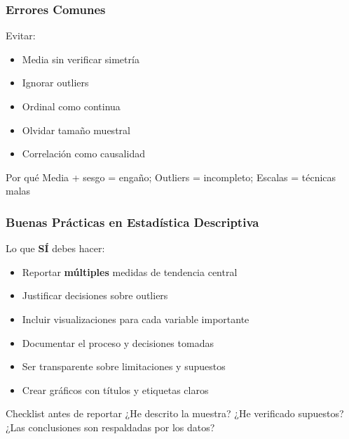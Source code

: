 \documentclass[aspectratio=169,11pt]{beamer}
\begin{document}
\begin{frame}[fragile]
\frametitle{Errores Comunes}
\small

\begin{alertblock}{Evitar:}
  \begin{itemize}
    \item Media sin verificar simetría
    \item Ignorar outliers
    \item Ordinal como continua
    \item Olvidar tamaño muestral
    \item Correlación como causalidad
  \end{itemize}
\end{alertblock}

\pause

\begin{block}{Por qué}
  Media + sesgo = engaño; Outliers = incompleto; Escalas = técnicas malas
\end{block}
\end{frame}

\begin{frame}[fragile]
\frametitle{Buenas Prácticas en Estadística Descriptiva}

\begin{block}{Lo que \textbf{SÍ} debes hacer:}
  \begin{itemize}
    \item \checkmark Reportar \textbf{múltiples} medidas de tendencia central
    \item \checkmark Justificar decisiones sobre outliers
    \item \checkmark Incluir visualizaciones para cada variable importante
    \item \checkmark Documentar el proceso y decisiones tomadas
    \item \checkmark Ser transparente sobre limitaciones y supuestos
    \item \checkmark Crear gráficos con títulos y etiquetas claros
  \end{itemize}
\end{block}

\pause

\begin{exampleblock}{Checklist antes de reportar}
  ¿He descrito la muestra? ¿He verificado supuestos? ¿Las conclusiones son respaldadas por los datos?
\end{exampleblock}
\end{frame}
\end{document}
